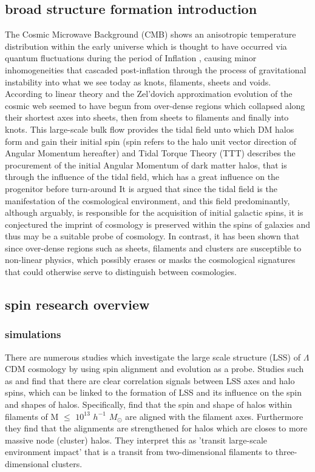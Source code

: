 \documentclass[a4paper,fleqn,usenatbib]{mnras}
\def \lcdm{$\Lambda$CDM }
\begin{document}
\subsection{broad structure formation introduction}
The Cosmic Microwave Background (CMB) shows an anisotropic temperature distribution within the early universe which is thought to have occurred via quantum fluctuations during the period of Inflation \citep{Guth_82}, causing minor inhomogeneities that cascaded post-inflation through the process of gravitational instability into what we see today as knots, filaments, sheets and voids. According to linear theory and the Zel'dovich approximation \citep{Zeldovich_70} evolution of the cosmic web seemed to have begun from over-dense regions which collapsed along their shortest axes into sheets, then from sheets to filaments and finally into knots. This large-scale bulk flow provides the tidal field unto which DM halos form and gain their initial spin (spin refers to the halo unit vector direction of Angular Momentum hereafter) and Tidal Torque Theory (TTT) describes the procurement of the initial Angular Momentum of dark matter halos, that is through the influence of the tidal field, which has a great influence on the progenitor before turn-around \citep[Holye 1949][]{Peebles_69,Zeldovich_70} 
It is argued that since the tidal field is the manifestation of the cosmological environment, and this field predominantly, although arguably, is responsible for the acquisition of initial galactic spins, it is conjectured the imprint of cosmology is preserved within the spins of galaxies \citep{Lee_pen_00} and thus may be a suitable probe of cosmology. In contrast, it has been shown that since over-dense regions such as sheets, filaments and clusters are susceptible to non-linear physics, which possibly erases or masks the cosmological signatures that could otherwise serve to distinguish between cosmologies.

\subsection{spin research overview}
\subsubsection{simulations}
There are numerous studies which investigate the large scale structure (LSS) of \lcdm cosmology by using spin alignment and evolution as a probe. Studies such as \citet{Faltenbacher_02,Calvo_07,Zhang_09} and \citet{Hahn_07} find that there are clear correlation signals between LSS axes and halo spins, which can be linked to the formation of LSS and its influence on the spin and shapes of halos. Specifically, \citet{Zhang_09} find that the spin and shape of halos within filaments of M $\leq$ $10^{13}$ $h^{-1}$ \(M_\odot\) are aligned with the filament axes. Furthermore they find that the alignments are strengthened for halos which are closes to more massive node (cluster) halos. They interpret this as 'transit large-scale environment impact' that is a transit from two-dimensional filaments to three-dimensional clusters.
\end{document}
